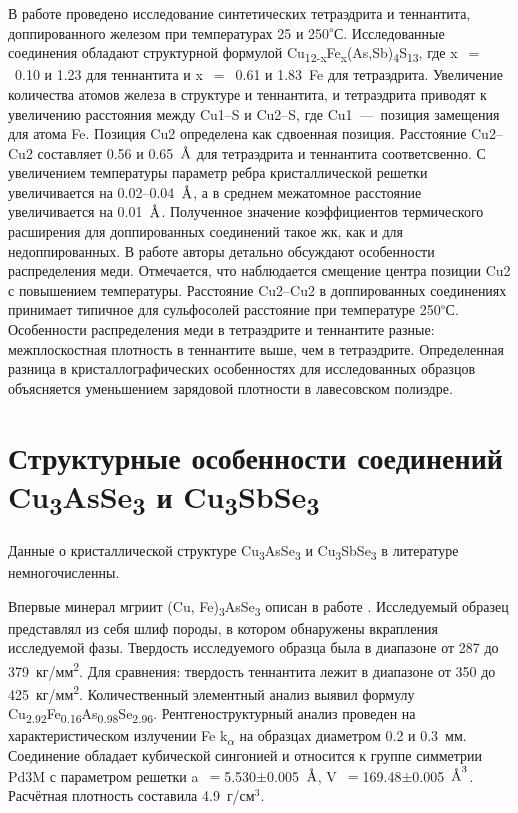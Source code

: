 В работе \cite{Friese2008} проведено исследование синтетических тетраэдрита и теннантита, доппированного железом при температурах 25 и 250\textsuperscript{$\circ$}С. Исследованные соединения обладают структурной формулой Cu\textsubscript{12-x}Fe\textsubscript{x}(As,Sb)\textsubscript{4}S\textsubscript{13}, где  x~$=$~0.10 и 1.23 для теннантита  и  x~$=$~0.61 и 1.83~Fe для тетраэдрита.
 Увеличение количества атомов железа в структуре и теннантита, и тетраэдрита приводят к увеличению расстояния между Cu1--S и Cu2--S, где Cu1~---~позиция замещения для атома Fe. Позиция Cu2 определена как сдвоенная позиция. Расстояние Cu2--Cu2 составляет 0.56 и 0.65~$\mbox{\normalfont\AA}$ для тетраэдрита и теннантита соответсвенно. С увеличением температуры параметр ребра кристаллической решетки увеличивается на 0.02--0.04~$\mbox{\normalfont\AA}$, а в среднем межатомное расстояние увеличивается на 0.01~$\mbox{\normalfont\AA}$. Полученное значение коэффициентов термического расширения для доппированных соединений такое жк, как и для недоппированных.
 В работе авторы детально обсуждают особенности распределения меди. Отмечается, что наблюдается смещение центра позиции Cu2 с повышением температуры. Расстояние Cu2--Cu2 в доппированных соединениях принимает типичное для сульфосолей расстояние при температуре 250\textsuperscript{$\circ$}С. Особенности распределения меди в тетраэдрите и теннантите разные:
межплоскостная плотность в теннантите выше, чем в тетраэдрите. Определенная разница в кристаллографических особенностях для исследованных образцов объясняется уменьшением зарядовой плотности в лавесовском полиэдре.
\newpage

\section{Структурные особенности соединений Cu\textsubscript{3}AsSe\textsubscript{3} и Cu\textsubscript{3}SbSe\textsubscript{3}} \label{sect1_2}

Данные о кристаллической структуре Cu\textsubscript{3}AsSe\textsubscript{3} и Cu\textsubscript{3}SbSe\textsubscript{3} в литературе немногочисленны.

Впервые минерал мгриит (Cu, Fe)\textsubscript{3}AsSe\textsubscript{3} описан в работе \cite{Dymlcov_1983}. Исследуемый образец представлял из себя шлиф породы, в котором обнаружены вкрапления исследуемой фазы. Твердость исследуемого образца была в диапазоне от 287 до 379~кг/мм\textsuperscript{2}. Для сравнения: твердость теннантита лежит в диапазоне от 350 до 425~кг/мм\textsuperscript{2}. Количественный элементный анализ выявил формулу Cu\textsubscript{2.92}Fe\textsubscript{0.16}As\textsubscript{0.98}Se\textsubscript{2.96}. Рентгеноструктурный анализ проведен на характеристическом излучении Fe k\textsubscript{$\alpha$} на образцах диаметром 0.2 и 0.3~мм. Соединение обладает кубической сингонией и относится к группе симметрии Pd3M с параметром решетки a~$=$5.530$\pm$0.005~$\mbox{\normalfont\AA}$, V~$=$169.48$\pm$0.005~$\mbox{\normalfont\AA}^{3}$. Расчётная плотность составила 4.9~г/см$^{3}$.

